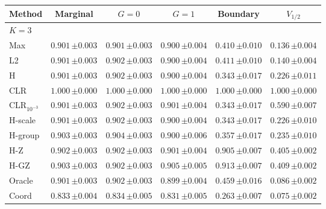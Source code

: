 \begin{tabular}{lccccc}\toprule
Method & Marginal & $G=0$ & $G=1$ & Boundary & $V_{1/2}$ \\\midrule
\multicolumn{6}{l}{$K=3$} \\
Max & $0.901\,{\scriptstyle\pm 0.003}$ & $0.901\,{\scriptstyle\pm 0.003}$ & $0.900\,{\scriptstyle\pm 0.004}$ & $0.410\,{\scriptstyle\pm 0.010}$ & $0.136\,{\scriptstyle\pm 0.004}$ \\
L2 & $0.901\,{\scriptstyle\pm 0.003}$ & $0.902\,{\scriptstyle\pm 0.003}$ & $0.900\,{\scriptstyle\pm 0.004}$ & $0.411\,{\scriptstyle\pm 0.010}$ & $0.140\,{\scriptstyle\pm 0.004}$ \\
H & $0.901\,{\scriptstyle\pm 0.003}$ & $0.902\,{\scriptstyle\pm 0.003}$ & $0.900\,{\scriptstyle\pm 0.004}$ & $0.343\,{\scriptstyle\pm 0.017}$ & $0.226\,{\scriptstyle\pm 0.011}$ \\
CLR & $1.000\,{\scriptstyle\pm 0.000}$ & $1.000\,{\scriptstyle\pm 0.000}$ & $1.000\,{\scriptstyle\pm 0.000}$ & $1.000\,{\scriptstyle\pm 0.000}$ & $1.000\,{\scriptstyle\pm 0.000}$ \\
CLR$_{10^{-3}}$ & $0.901\,{\scriptstyle\pm 0.003}$ & $0.902\,{\scriptstyle\pm 0.003}$ & $0.901\,{\scriptstyle\pm 0.004}$ & $0.343\,{\scriptstyle\pm 0.017}$ & $0.590\,{\scriptstyle\pm 0.007}$ \\
H-scale & $0.901\,{\scriptstyle\pm 0.003}$ & $0.902\,{\scriptstyle\pm 0.003}$ & $0.900\,{\scriptstyle\pm 0.004}$ & $0.343\,{\scriptstyle\pm 0.017}$ & $0.226\,{\scriptstyle\pm 0.010}$ \\
H-group & $0.903\,{\scriptstyle\pm 0.003}$ & $0.904\,{\scriptstyle\pm 0.003}$ & $0.900\,{\scriptstyle\pm 0.006}$ & $0.357\,{\scriptstyle\pm 0.017}$ & $0.235\,{\scriptstyle\pm 0.010}$ \\
H-Z & $0.902\,{\scriptstyle\pm 0.003}$ & $0.902\,{\scriptstyle\pm 0.003}$ & $0.901\,{\scriptstyle\pm 0.004}$ & $0.905\,{\scriptstyle\pm 0.007}$ & $0.405\,{\scriptstyle\pm 0.002}$ \\
H-GZ & $0.903\,{\scriptstyle\pm 0.003}$ & $0.902\,{\scriptstyle\pm 0.003}$ & $0.905\,{\scriptstyle\pm 0.005}$ & $0.913\,{\scriptstyle\pm 0.007}$ & $0.409\,{\scriptstyle\pm 0.002}$ \\
Oracle & $0.901\,{\scriptstyle\pm 0.003}$ & $0.902\,{\scriptstyle\pm 0.003}$ & $0.899\,{\scriptstyle\pm 0.004}$ & $0.459\,{\scriptstyle\pm 0.016}$ & $0.086\,{\scriptstyle\pm 0.002}$ \\
Coord & $0.833\,{\scriptstyle\pm 0.004}$ & $0.834\,{\scriptstyle\pm 0.005}$ & $0.831\,{\scriptstyle\pm 0.005}$ & $0.263\,{\scriptstyle\pm 0.007}$ & $0.075\,{\scriptstyle\pm 0.002}$ \\

\end{tabular}
